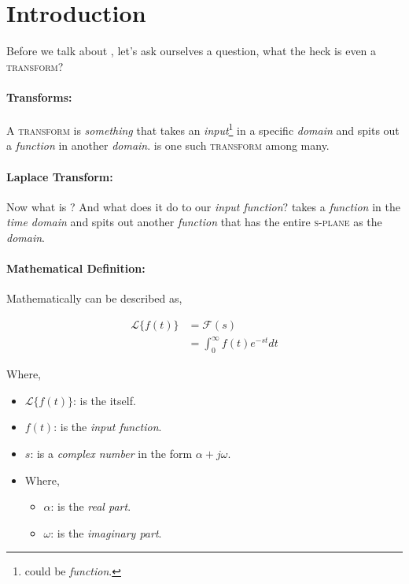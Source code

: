 \documentclass[../../course]{subfiles}
\begin{document}
\section{Introduction} \label{sec:ch06Intro}

Before we talk about \lt, let's ask ourselves a question, what the heck is even a
\textsc{transform}?

\paragraph{Transforms:} A \textsc{transform} is \emph{something} that
takes an \emph{input}\footnote{could be \emph{function}.} in a specific
\emph{domain} and spits out a \emph{function} in another \emph{domain}.
\lt is one such \textsc{transform} among many.

\paragraph{Laplace Transform:} Now what is \lt? And what does it do to our
\emph{input function}? \lt takes a \emph{function} in the \emph{time domain}
and spits out another \emph{function} that has the entire \textsc{s-plane} as
the \emph{domain}.

\paragraph{Mathematical Definition:} Mathematically \lt can be described as,

\begin{align}
    \mathcal{L}\{f(t)\} &= \mathcal{F}(s) \\
    &= \int_{0}^{\infty} f(t) e^{-st} dt
\end{align}

Where,

\begin{itemize} [label=]
    \item $\mathcal{L}\{f(t)\}$: is the \lt itself.

    \item $f(t)$: is the \emph{input function}.

    \item $s$: is a \emph{complex number} in the form $\alpha + j \omega$.

    \item
        Where,

        \begin{itemize} [label=]
            \item $\alpha$: is the \emph{real part}.
            \item $\omega$: is the \emph{imaginary part}.
        \end{itemize}
\end{itemize}
\end{document}
